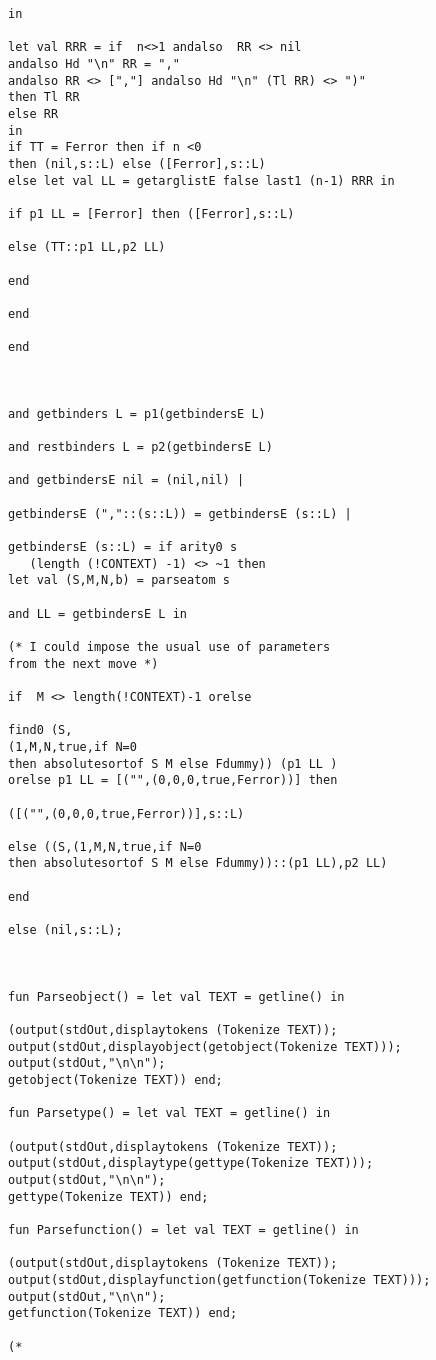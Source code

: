 \documentclass[12pt]{article}
\begin{document}
\begin{verbatim}
in

let val RRR = if  n<>1 andalso  RR <> nil 
andalso Hd "\n" RR = "," 
andalso RR <> [","] andalso Hd "\n" (Tl RR) <> ")"
then Tl RR
else RR
in
if TT = Ferror then if n <0 
then (nil,s::L) else ([Ferror],s::L)
else let val LL = getarglistE false last1 (n-1) RRR in

if p1 LL = [Ferror] then ([Ferror],s::L)

else (TT::p1 LL,p2 LL)

end

end

end



and getbinders L = p1(getbindersE L)

and restbinders L = p2(getbindersE L)

and getbindersE nil = (nil,nil) |

getbindersE (","::(s::L)) = getbindersE (s::L) |

getbindersE (s::L) = if arity0 s 
   (length (!CONTEXT) -1) <> ~1 then 
let val (S,M,N,b) = parseatom s

and LL = getbindersE L in

(* I could impose the usual use of parameters
from the next move *)

if  M <> length(!CONTEXT)-1 orelse 

find0 (S,
(1,M,N,true,if N=0 
then absolutesortof S M else Fdummy)) (p1 LL )
orelse p1 LL = [("",(0,0,0,true,Ferror))] then 

([("",(0,0,0,true,Ferror))],s::L)

else ((S,(1,M,N,true,if N=0 
then absolutesortof S M else Fdummy))::(p1 LL),p2 LL)

end

else (nil,s::L);



fun Parseobject() = let val TEXT = getline() in

(output(stdOut,displaytokens (Tokenize TEXT));
output(stdOut,displayobject(getobject(Tokenize TEXT)));
output(stdOut,"\n\n");
getobject(Tokenize TEXT)) end;

fun Parsetype() = let val TEXT = getline() in

(output(stdOut,displaytokens (Tokenize TEXT));
output(stdOut,displaytype(gettype(Tokenize TEXT)));
output(stdOut,"\n\n");
gettype(Tokenize TEXT)) end;

fun Parsefunction() = let val TEXT = getline() in

(output(stdOut,displaytokens (Tokenize TEXT));
output(stdOut,displayfunction(getfunction(Tokenize TEXT)));
output(stdOut,"\n\n");
getfunction(Tokenize TEXT)) end;

(*

\end{verbatim}
\end{document}
